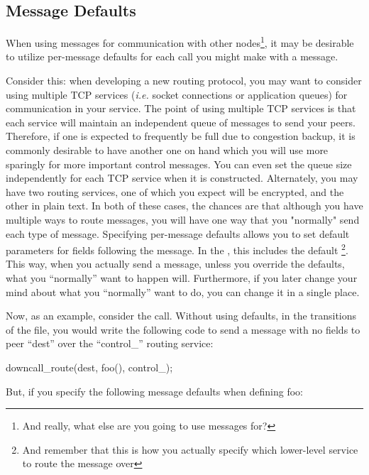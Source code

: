 \subsection{Message Defaults}
\label{sec:msgdefs}

When using messages for communication with other nodes\footnote{And really, what
else are you going to use messages for?}, it may be desirable to utilize
per-message defaults for each call you might make with a message.

Consider this: when developing a new routing protocol, you may want to consider
using multiple TCP services (\emph{i.e.} socket connections or application
queues) for communication in your service.  The point of using multiple TCP
services is that each service will maintain an independent queue of messages to
send your peers.  Therefore, if one is expected to frequently be full due to
congestion backup, it is commonly desirable to have another one on hand which
you will use more sparingly for more important control messages.  You can even
set the queue size independently for each TCP service when it is constructed.
Alternately, you may have two routing services, one of which you expect will be
encrypted, and the other in plain text.  In both of these cases, the chances
are that although you have multiple ways to route messages, you will have one
way that you "normally" send each type of message.  Specifying per-message
defaults allows you to set default parameters for fields following the message.
In the , this includes the default
\footnote{And remember that this is how you
actually specify which lower-level service to route the message over}.  This
way, when you actually send a message, unless you override the defaults, what
you ``normally'' want to happen will.  Furthermore, if you later change your
mind about what you ``normally'' want to do, you can change it in a single
place.

Now, as an example, consider the 
call.  Without using defaults, in the transitions of the \mac file,
you would write the following code to send a  message with no
fields to peer ``dest'' over the ``control\_'' routing service:

\begin{programlisting}
downcall_route(dest, foo(), control_);
\end{programlisting}
But, if you specify the following message defaults when defining foo:

